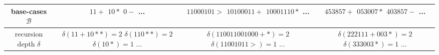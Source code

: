 \documentclass[11pt]{article}
\begin{document}
\begin{table}[htbp]
{\begin{tabular}{|c|c|c|c|}
\makecell{base-cases\\$\mathcal{B}$} & \makecell{\\$11+$\\\\$10*$\\\\$0-$\\\\...\\\\}
& \makecell{\\$11000101>$\\\\$10100011+$\\\\$10001110*$\\\\...\\\\} 
& \makecell{\\$453857+$\\\\$053007*$\\\\$403857-$\\\\...\\\\}  \\
\hline


\makecell{recursion depth\\$\delta$} & 
\makecell{\\$\delta(11+10**)=2$\\\\$\delta(110**)=2$\\\\$\delta(10*)=1$\\\\...\\\\} & 
\makecell{\\$\delta(110011001000+*)=2$\\\\$\delta(11001011>)=1$\\\\...\\\\} & 
\makecell{\\$\delta(222111+003*)=2$\\\\$\delta(333003*)=1$\\\\...\\\\} \\
\hline


\end{tabular}}
\end{table}
\end{document}
